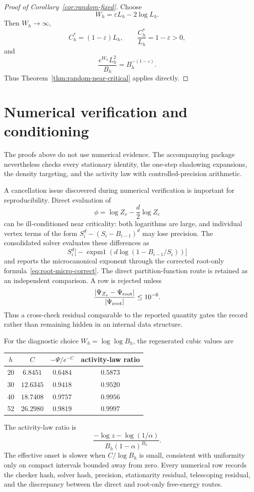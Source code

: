 \documentclass[11pt]{amsart}
\theoremstyle{definition}
\newcommand{\eps}{\varepsilon}
\begin{document}
\begin{proof}[Proof of Corollary~\ref{cor:random-fixed}]
Choose
\[
 W_h=\eps L_h-2\log L_h.
\]
Then $W_h\to\infty$,
\[
 C_h^*=(1-\eps)L_h,
 \qquad
 \frac{C_h^*}{L_h}=1-\eps>0,
\]
and
\[
 \frac{e^{W_h}L_h^2}{B_h}=B_h^{-(1-\eps)}.
\]
Thus Theorem~\ref{thm:random-near-critical} applies directly.
\end{proof}



\section{Numerical verification and conditioning}\label{sec:numerics}
The proofs above do not use numerical evidence.  The accompanying package nevertheless checks every stationary identity, the one-step shadowing expansions, the density targeting, and the activity law with controlled-precision arithmetic.

A cancellation issue discovered during numerical verification is important for reproducibility.  Direct evaluation of
\[
 \phi=\log Z_v-\frac d2\log Z_e
\]
can be ill-conditioned near criticality: both logarithms are large, and individual vertex terms of the form $S_i^d-(S_i-B_{i-1})^d$ may lose precision.  The consolidated solver evaluates these differences as
\[
 S_i^d\bigl[-\operatorname{expm1}(d\log(1-B_{i-1}/S_i))\bigr]
\]
and reports the microcanonical exponent through the corrected root-only formula~\eqref{eq:root-micro-correct}.  The direct partition-function route is retained as an independent comparison.  A row is rejected unless
\[
 \frac{|\Psi_{Z_v}-\Psi_{\rm root}|}{|\Psi_{\rm root}|}\le10^{-6}.
\]
Thus a cross-check residual comparable to the reported quantity gates the record rather than remaining hidden in an internal data structure.

For the diagnostic choice $W_h=\log\log B_h$, the regenerated cubic values are
\begin{center}
\begin{tabular}{cccc}
\toprule
$h$ & $C$ & $-\Psi/e^{-C}$ & activity-law ratio\\
\midrule
20 & $6.8451$ & $0.6484$ & $0.5873$\\
30 & $12.6345$ & $0.9418$ & $0.9520$\\
40 & $18.7408$ & $0.9757$ & $0.9956$\\
52 & $26.2980$ & $0.9819$ & $0.9997$\\
\bottomrule
\end{tabular}
\end{center}
The activity-law ratio is
\[
 \frac{-\log z-\log(1/\alpha)}{B_h(1-\alpha)^{B_h}}.
\]
The effective onset is slower when $C/\log B_h$ is small, consistent with uniformity only on compact intervals bounded away from zero.  Every numerical row records the checker hash, solver hash, precision, stationarity residual, telescoping residual, and the discrepancy between the direct and root-only free-energy routes.
\end{document}
